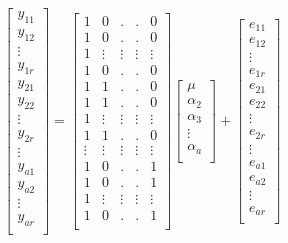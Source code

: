 \documentclass[
  10pt,
]{book}
\theoremstyle{definition}
\theoremstyle{definition}
\theoremstyle{definition}
\theoremstyle{definition}
\theoremstyle{remark}
\begin{document}
\begin{equation}
\begin{bmatrix}
y_{11} \\
y_{12} \\
\vdots \\
y_{1r} \\
y_{21} \\
y_{22} \\
\vdots \\
y_{2r} \\
\vdots \\
y_{a1} \\
y_{a2} \\
\vdots \\
y_{ar} \\
\end{bmatrix} 
 =
\begin{bmatrix}
1 &  0 & . & . & 0 \\
1 &  0 & . & . & 0 \\
1 &  \vdots & \vdots & \vdots & \vdots \\
1 &  0 & . & . & 0 \\
1 &  1 & . & . & 0 \\
1 &  1 & . & . & 0 \\
1 &  \vdots & \vdots & \vdots & \vdots \\
1 &  1 & . & . & 0 \\
\vdots &  \vdots & \vdots & \vdots & \vdots \\
1 &  0 & . & . & 1 \\
1 &  0 & . & . & 1 \\
1 &  \vdots & \vdots & \vdots & \vdots \\
1 &  0 & . & . & 1 \\
\end{bmatrix}
\begin{bmatrix}
\mu \\
\alpha_{2} \\
\alpha_{3} \\
\vdots \\
\alpha_{a} \\
\end{bmatrix} +
\begin{bmatrix}
e_{11} \\
e_{12} \\
\vdots \\
e_{1r} \\
e_{21} \\
e_{22} \\
\vdots \\
e_{2r} \\
\vdots \\
e_{a1} \\
e_{a2} \\
\vdots \\
e_{ar} \\
\end{bmatrix}
\label{eq:lm-zero}
\end{equation}
\end{document}
